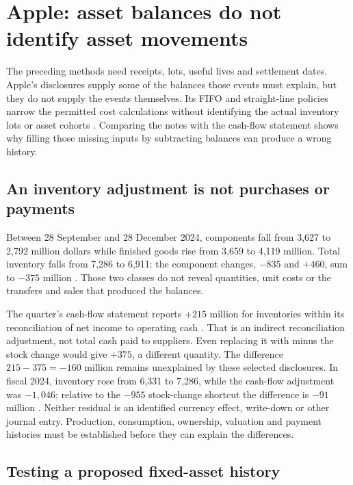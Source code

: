 \section{Apple: asset balances do not identify asset movements}
\label{sec:apple-operating-assets}

The preceding methods need receipts, lots, useful lives and settlement dates.
Apple's disclosures supply some of the balances those events must explain,
but they do not supply the events themselves. Its FIFO and straight-line
policies narrow the permitted cost calculations without identifying the actual
inventory lots or asset cohorts \citep[Note 1, printed p.~34]{apple2024}.
Comparing the notes with the cash-flow statement shows why filling those
missing inputs by subtracting balances can produce a wrong history.

\subsection{An inventory adjustment is not purchases or payments}

Between 28 September and 28 December 2024, components fall from 3,627 to 2,792
million dollars while finished goods rise from 3,659 to 4,119 million. Total
inventory falls from 7,286 to 6,911: the component changes, $-835$ and $+460$,
sum to $-375$ million \citep[Note 5, printed p.~9]{apple2025q1}. Those two
classes do not reveal quantities, unit costs or the transfers and sales that
produced the balances.

The quarter's cash-flow statement reports $+215$ million for inventories within
its reconciliation of net income to operating cash \citep[printed p.~5]{apple2025q1}.
That is an indirect reconciliation adjustment, not total cash paid to suppliers.
Even replacing it with minus the stock change would give $+375$, a different
quantity. The difference $215-375=-160$ million remains unexplained by these
selected disclosures. In fiscal 2024, inventory rose from 6,331 to 7,286, while
the cash-flow adjustment was $-1{,}046$; relative to the $-955$ stock-change
shortcut the difference is $-91$ million \citep[printed pp.~31 and 33]{apple2024}.
Neither residual is an identified currency effect, write-down or other journal
entry. Production, consumption, ownership, valuation and payment histories must
be established before they can explain the differences.

\subsection{Testing a proposed fixed-asset history}

